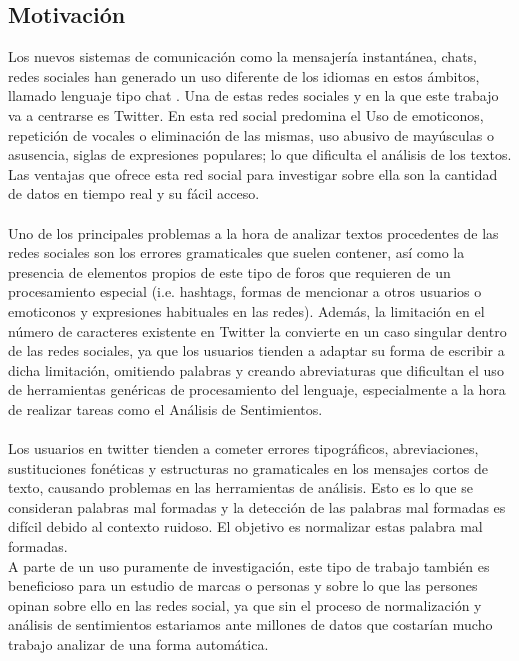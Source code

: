 \documentclass[spanish,12pt, a4paper,twoside]{paper}
\begin{document}
\subsection{Motivación}\label{sec:motivacion}
Los nuevos sistemas de comunicación como la mensajería instantánea, chats, redes sociales han generado un uso diferente de los idiomas en estos ámbitos, llamado lenguaje tipo chat \cite{forsyth:2007}. Una de estas redes sociales y en la que este trabajo va a centrarse es Twitter. En esta red social predomina el Uso de emoticonos, repetición de vocales o eliminación de las mismas, uso abusivo de mayúsculas o asusencia, siglas de expresiones populares; lo que dificulta el análisis de los textos. Las ventajas que ofrece esta red social para investigar sobre ella son la cantidad de datos en tiempo real y su fácil acceso.\\\\Uno de los principales problemas a la hora de analizar textos procedentes de las redes sociales son los errores gramaticales que suelen contener, así como la presencia de elementos propios de este tipo de foros que requieren de un procesamiento especial (i.e. hashtags, formas de mencionar a otros usuarios o emoticonos y expresiones habituales en las redes). Además, la limitación en el número de caracteres existente en Twitter la convierte en un caso singular dentro de las redes sociales, ya que los usuarios tienden a adaptar su forma de escribir a dicha limitación, omitiendo palabras y creando abreviaturas que dificultan el uso de herramientas genéricas de procesamiento del lenguaje, especialmente a la hora de realizar tareas como el Análisis de Sentimientos.\\\\Los usuarios en twitter tienden a cometer errores tipográficos, abreviaciones, sustituciones fonéticas y estructuras no gramaticales en los mensajes cortos de texto, causando problemas en las herramientas de análisis. Esto es lo que se consideran palabras mal formadas y la detección de las palabras mal formadas es difícil debido al contexto ruidoso. El objetivo es normalizar estas palabra mal formadas.\\A parte de un uso puramente de investigación, este tipo de trabajo también es beneficioso para un estudio de marcas o personas y sobre lo que las persones opinan sobre ello en las redes social, ya que sin el proceso de normalización y análisis de sentimientos estariamos ante millones de datos que costarían mucho trabajo analizar de una forma automática.
\end{document}
